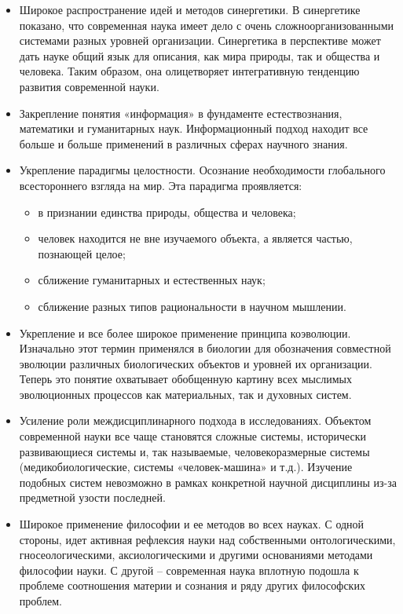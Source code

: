 \begin{itemize}
    \item Широкое распространение идей и методов синергетики. 
    В синергетике показано, что современная наука имеет дело с очень сложноорганизованными системами разных уровней организации. Синергетика в перспективе может дать науке общий язык для описания, как мира природы, так и общества и человека. Таким образом, она олицетворяет интегративную тенденцию развития современной науки.
    \item Закрепление понятия «информация» в фундаменте естествознания, математики и гуманитарных наук. Информационный подход находит все больше и больше применений в различных сферах научного знания.
    \item  Укрепление парадигмы целостности. Осознание необходимости глобального  всестороннего взгляда на мир. Эта парадигма проявляется:
    \begin{itemize}
        \item в признании единства природы, общества и человека;
        \item человек находится не вне изучаемого объекта, а является частью, познающей целое;
        \item сближение гуманитарных и естественных наук;
        \item сближение разных типов рациональности в научном мышлении.
    \end{itemize}
    \item Укрепление и все более широкое применение принципа коэволюции. Изначально этот термин применялся в биологии для обозначения совместной эволюции различных биологических объектов и уровней их организации. Теперь это понятие охватывает обобщенную картину всех мыслимых эволюционных процессов как материальных, так и духовных систем.
    \item Усиление роли междисциплинарного подхода в исследованиях. Объектом современной науки все чаще становятся сложные системы, исторически развивающиеся системы и, так называемые, человекоразмерные системы (медикобиологические, системы «человек-машина» и т.д.). Изучение подобных систем невозможно в рамках конкретной научной дисциплины из-за предметной узости последней.
    \item Широкое применение философии и ее методов во всех науках. С одной стороны, идет активная рефлексия науки над собственными онтологическими, гносеологическими, аксиологическими и другими основаниями методами философии науки. С другой – современная наука вплотную подошла к проблеме соотношения материи и сознания и ряду других философских проблем.

\end{itemize}
